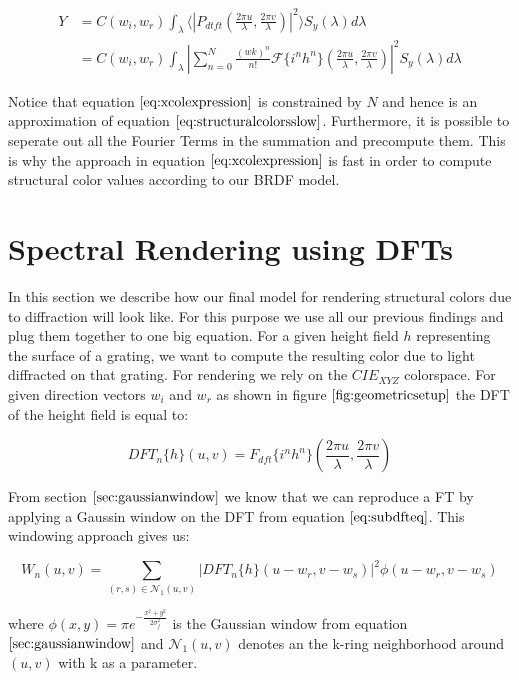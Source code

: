 \begin{align}
Y 
& = C(w_i,w_r) \int_{\lambda} \langle \left|P_{dtft}(\frac{2\pi u}{\lambda}, \frac{2\pi v}{\lambda})\right|^2\rangle S_y(\lambda)d\lambda \nonumber \\
& = C(w_i,w_r) \int_{\lambda} \left| \sum_{n=0}^N \frac{(wk)^n}{n!} \mathcal{F}\{i^n h^n\}(\frac{2\pi u}{\lambda}, \frac{2\pi v}{\lambda})\right|^2 S_y(\lambda)d\lambda
\label{eq:xcolexpression}
\end{align}

Notice that equation $\ref{eq:xcolexpression}$ is constrained by $N$ and hence is an approximation of equation $\ref{eq:structuralcolorsslow}$. Furthermore, it is possible to seperate out all the Fourier Terms in the summation and precompute them. This is why the approach in equation $\ref{eq:xcolexpression}$ is fast in order to compute structural color values according to our BRDF model.

\section{Spectral Rendering using DFTs}
\label{sec:spectralrendering}
In this section we describe how our final model for rendering structural colors due to diffraction will look like. For this purpose we use all our previous findings and plug them together to one big equation. For a given height field $h$ representing the surface of a grating, we want to compute the resulting color due to light diffracted on that grating. For rendering we rely on the $CIE_{XYZ}$ colorspace. For given direction vectors $w_i$ and $w_r$ as shown in figure $\ref{fig:geometricsetup}$ the DFT of the height field is equal to:

\begin{equation}
DFT_{n}\{h\}(u,v) = {F}_{dft}\{i^n h^n\}(\frac{2\pi u}{\lambda},\frac{2\pi v}{\lambda})
\label{eq:subdfteq}
\end{equation}

From section $\ref{sec:gaussianwindow}$ we know that we can reproduce a FT by applying a Gaussin window on the DFT from equation $\ref{eq:subdfteq}$. This windowing approach gives us: 

\begin{equation}
  W_{n}(u,v) = \sum_{(r,s) \in \mathcal{N}_1(u,v)} \left| DFT_{n}\{h\}(u-w_r, v-w_s) \right|^2 \phi(u-w_r, v-w_s)
  \label{eq:wnwindowingapproachsub}
\end{equation}

where $\phi(x,y) = \pi e^{-\frac{x^2 + y^2}{2\sigma_{f}^2}}$ is the Gaussian window from equation $\ref{sec:gaussianwindow}$ and $\mathcal{N}_1(u,v)$ denotes an the k-ring neighborhood around $(u,v)$ with k as a parameter. \\

